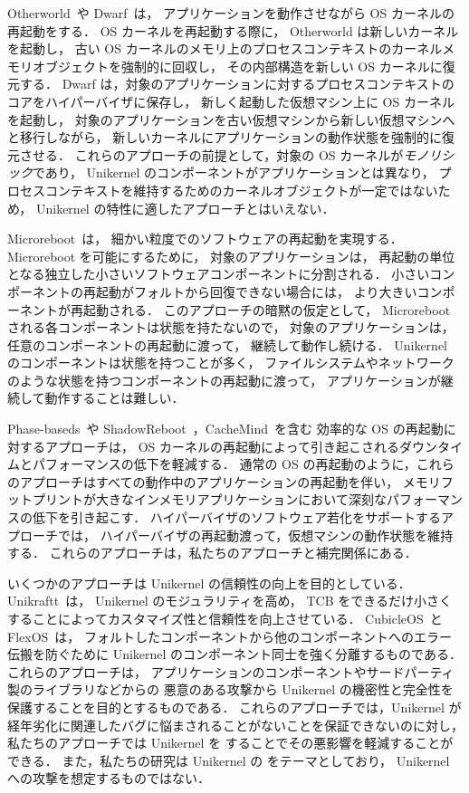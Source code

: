 Otherworld~\cite{DepoutovitchEtAl-otherworld}や Dwarf~\cite{TeradaEtAl-Dwarf}は，
アプリケーションを動作させながら OS カーネルの再起動をする．
OS カーネルを再起動する際に，
Otherworld は新しいカーネルを起動し，
古い OS カーネルのメモリ上のプロセスコンテキストのカーネルメモリオブジェクトを強制的に回収し，
その内部構造を新しい OS カーネルに復元する．
Dwarf は，対象のアプリケーションに対するプロセスコンテキストのコアをハイパーバイザに保存し，
新しく起動した仮想マシン上に OS カーネルを起動し，
対象のアプリケーションを古い仮想マシンから新しい仮想マシンへと移行しながら，
新しいカーネルにアプリケーションの動作状態を強制的に復元させる．
これらのアプローチの前提として，対象の OS カーネルが\emph{モノリシック}であり，
Unikernel のコンポーネントがアプリケーションとは異なり，
プロセスコンテキストを維持するためのカーネルオブジェクトが一定ではないため，
Unikernel の特性に適したアプローチとはいえない．


Microreboot~\cite{CandeaEtAl-Microreboot}は，
細かい粒度でのソフトウェアの再起動を実現する．
Microreboot を可能にするために，
対象のアプリケーションは，
再起動の単位となる独立した小さいソフトウェアコンポーネントに分割される．
小さいコンポーネントの再起動がフォルトから回復できない場合には，
より大きいコンポーネントが再起動される．
このアプローチの暗黙の仮定として，
Microreboot される各コンポーネントは状態を持たないので，
対象のアプリケーションは，任意のコンポーネントの再起動に渡って，
継続して動作し続ける．
Unikernel のコンポーネントは状態を持つことが多く，
ファイルシステムやネットワークのような状態を持つコンポーネントの再起動に渡って，
アプリケーションが継続して動作することは難しい．

Phase-baseds~\cite{YamakitaEtAl-PBR}や ShadowReboot~\cite{YamadaEtAl-ShadowR}，CacheMind~\cite{KouraiEtAl-cachemind}を含む
効率的な OS の再起動に対するアプローチは，
OS カーネルの再起動によって引き起こされるダウンタイムとパフォーマンスの低下を軽減する．
通常の OS の再起動のように，これらのアプローチはすべての動作中のアプリケーションの再起動を伴い，
メモリフットプリントが大きなインメモリアプリケーションにおいて深刻なパフォーマンスの低下を引き起こす．
ハイパーバイザのソフトウェア若化をサポートするアプローチでは，
ハイパーバイザの再起動渡って，仮想マシンの動作状態を維持する．
これらのアプローチは，私たちのアプローチと補完関係にある．

いくつかのアプローチは Unikernel の信頼性の向上を目的としている．
Unikraftt~\cite{KuenzerEtAl-Unikraft}は，
Unikernel のモジュラリティを高め，
TCB をできるだけ小さくすることによってカスタマイズ性と信頼性を向上させている．
CubicleOS~\cite{SartakovEtAl-ASPLOS21}と FlexOS~\cite{LefeuvreEtAl-FlexOS}は，
フォルトしたコンポーネントから他のコンポーネントへのエラー伝搬を防ぐために
Unikernel のコンポーネント同士を強く分離するものである．
これらのアプローチは，
アプリケーションのコンポーネントやサードパーティ製のライブラリなどからの
悪意のある攻撃から Unikernel の機密性と完全性を保護することを目的とするものである．
これらのアプローチでは，Unikernel が経年劣化に関連したバグに悩まされることがないことを保証できないのに対し，
私たちのアプローチでは Unikernel を \rr することでその悪影響を軽減することができる．
また，私たちの研究は Unikernel の \rr をテーマとしており，
Unikernel への攻撃を想定するものではない．


